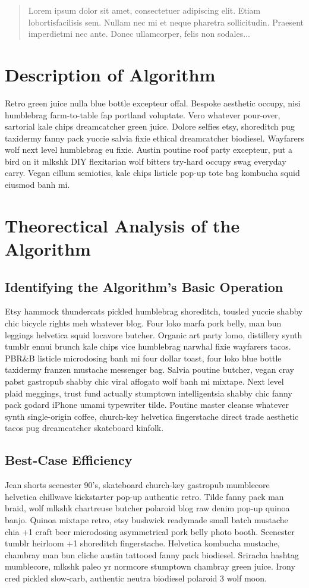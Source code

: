 \documentclass[12pt]{article}
\begin{document}
\begin{abstract}
	Lorem  ipsum  dolor  sit  amet,  consectetuer  adipiscing  
	elit.   Etiam  lobortisfacilisis sem.  Nullam nec mi et 
	neque pharetra sollicitudin.  Praesent imperdietmi nec ante. 
	Donec ullamcorper, felis non sodales...
\end{abstract}
\section{Description of Algorithm}
Retro green juice nulla blue bottle excepteur offal. Bespoke aesthetic occupy, nisi humblebrag farm-to-table fap portland voluptate. Vero whatever pour-over, sartorial kale chips dreamcatcher green juice. Dolore selfies etsy, shoreditch pug taxidermy fanny pack yuccie salvia fixie ethical dreamcatcher biodiesel. Wayfarers wolf next level humblebrag eu fixie. Austin poutine roof party excepteur, put a bird on it mlkshk DIY flexitarian wolf bitters try-hard occupy swag everyday carry. Vegan cillum semiotics, kale chips listicle pop-up tote bag kombucha squid eiusmod banh mi.
\cite[chapter, p.~215]{skiena1998algorithm}
\section{Theorectical Analysis of the Algorithm}

\subsection{Identifying the Algorithm's Basic Operation}
\textsl{}Etsy hammock thundercats pickled humblebrag shoreditch, tousled yuccie shabby chic bicycle rights meh whatever blog. Four loko marfa pork belly, man bun leggings helvetica squid locavore butcher. Organic art party lomo, distillery synth tumblr ennui brunch kale chips vice humblebrag narwhal fixie wayfarers tacos. PBR&B listicle microdosing banh mi four dollar toast, four loko blue bottle taxidermy franzen mustache messenger bag. Salvia poutine butcher, vegan cray pabst gastropub shabby chic viral affogato wolf banh mi mixtape. Next level plaid meggings, trust fund actually stumptown intelligentsia shabby chic fanny pack godard iPhone umami typewriter tilde. Poutine master cleanse whatever synth single-origin coffee, church-key helvetica fingerstache direct trade aesthetic tacos pug dreamcatcher skateboard kinfolk.
\subsection{Best-Case Efficiency}
Jean shorts scenester 90's, skateboard church-key gastropub mumblecore helvetica chillwave kickstarter pop-up authentic retro. Tilde fanny pack man braid, wolf mlkshk chartreuse butcher polaroid blog raw denim pop-up quinoa banjo. Quinoa mixtape retro, etsy bushwick readymade small batch mustache chia +1 craft beer microdosing asymmetrical pork belly photo booth. Scenester tumblr heirloom +1 shoreditch fingerstache. Helvetica kombucha mustache, chambray man bun cliche austin tattooed fanny pack biodiesel. Sriracha hashtag mumblecore, mlkshk paleo yr normcore stumptown chambray green juice. Irony cred pickled slow-carb, authentic neutra biodiesel polaroid 3 wolf moon.
\end{document}
